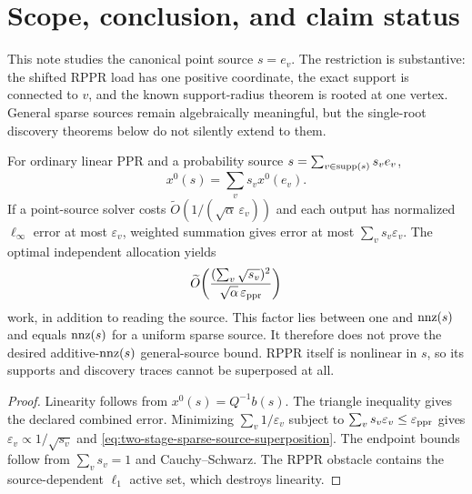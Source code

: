 \section{Scope, conclusion, and claim status}
\label{sec:two-stage-scope}

This note studies the canonical point source $s=e_v$.  The restriction is
substantive: the shifted RPPR load has one positive coordinate, the exact
support is connected to $v$, and the known support-radius theorem is rooted at
one vertex.  General sparse sources remain algebraically meaningful, but the
single-root discovery theorems below do not silently extend to them.

\begin{proposition}
\label{prop:two-stage-sparse-source-superposition}
For ordinary linear PPR and a probability source
$s=\sum_{v\in\operatorname{supp}(s)}s_ve_v$,
\begin{equation*}
 x^0(s)=\sum_v s_vx^0(e_v).
\end{equation*}
If a point-source solver costs
$\widetilde O(1/(\sqrt\alpha\,\varepsilon_v))$ and each output has normalized
$\ell_\infty$ error at most $\varepsilon_v$, weighted summation gives error
at most $\sum_vs_v\varepsilon_v$.  The optimal independent allocation yields
\begin{equation}
 \widetilde O\!\left(
  \frac{(\sum_v\sqrt{s_v})^2}
       {\sqrt\alpha\,\varepsilon_{\mathrm{ppr}}}
 \right)
 \label{eq:two-stage-sparse-source-superposition}
\end{equation}
work, in addition to reading the source.  This factor lies between one and
$\operatorname{nnz}(s)$ and equals $\operatorname{nnz}(s)$ for a uniform sparse source.  It therefore
does not prove the desired additive-$\operatorname{nnz}(s)$ general-source bound.
RPPR itself is nonlinear in $s$, so its supports and discovery traces cannot
be superposed at all.
\end{proposition}

\begin{proof}
Linearity follows from $x^0(s)=Q^{-1}b(s)$.  The triangle inequality gives
the declared combined error.  Minimizing
$\sum_v1/\varepsilon_v$ subject to
$\sum_vs_v\varepsilon_v\leq\varepsilon_{\mathrm{ppr}}$ gives
$\varepsilon_v\propto1/\sqrt{s_v}$ and
\cref{eq:two-stage-sparse-source-superposition}.  The endpoint bounds follow
from $\sum_vs_v=1$ and Cauchy--Schwarz.  The RPPR obstacle contains the
source-dependent $\ell_1$ active set, which destroys linearity.
\end{proof}

